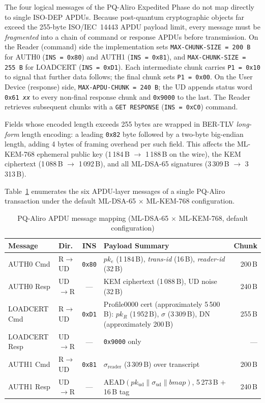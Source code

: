 \documentclass[runningheads]{llncs}
\begin{document}
The four logical messages of the PQ-Aliro Expedited Phase do not map directly
to single ISO-DEP APDUs.  Because post-quantum cryptographic objects far exceed
the 255-byte ISO/IEC~14443 APDU payload limit, every message must be
\emph{fragmented} into a chain of command or response APDUs before transmission.
On the Reader (command) side the implementation sets
\texttt{MAX-CHUNK-SIZE = 200\,B} for AUTH0 (\texttt{INS = 0x80}) and AUTH1
(\texttt{INS = 0x81}), and \texttt{MAX-CHUNK-SIZE = 255\,B} for LOADCERT
(\texttt{INS = 0xD1}).
Each intermediate chunk carries \texttt{P1 = 0x10} to signal that further data
follows; the final chunk sets \texttt{P1 = 0x00}.
On the User Device (response) side, \texttt{MAX-APDU-CHUNK = 240\,B}; the UD
appends status word \texttt{0x61\,\textit{xx}} to every non-final response chunk
and \texttt{0x9000} to the last.
The Reader retrieves subsequent chunks with a \texttt{GET RESPONSE}
(\texttt{INS = 0xC0}) command.

Fields whose encoded length exceeds 255 bytes are wrapped in BER-TLV
\emph{long-form} length encoding: a leading \texttt{0x82} byte followed by a
two-byte big-endian length, adding 4 bytes of framing overhead per such field.
This affects the ML-KEM-768 ephemeral public key (1\,184\,B $\to$ 1\,188\,B
on the wire), the KEM ciphertext (1\,088\,B $\to$ 1\,092\,B), and all
ML-DSA-65 signatures (3\,309\,B $\to$ 3\,313\,B).

Table~\ref{tab:apdu} enumerates the six APDU-layer messages of a single
PQ-Aliro transaction under the default ML-DSA-65 $\times$ ML-KEM-768
configuration.

\begin{table}[t]
\caption{PQ-Aliro APDU message mapping (ML-DSA-65 $\times$ ML-KEM-768, default configuration)}
\label{tab:apdu}
\centering
\small
\begin{tabular}{@{}llcp{4.8cm}r@{}}
\hline
\textbf{Message} & \textbf{Dir.} & \textbf{INS} & \textbf{Payload Summary} & \textbf{Chunk} \\
\hline
AUTH0 Cmd    & R$\to$UD & \texttt{0x80} &
    $pk_e$ (1\,184\,B), \textit{trans-id} (16\,B), \textit{reader-id} (32\,B) &
    200\,B \\
AUTH0 Resp   & UD$\to$R & --- &
    KEM ciphertext (1\,088\,B), UD noise (32\,B) &
    240\,B \\
LOADCERT Cmd & R$\to$UD & \texttt{0xD1} &
    Profile0000 cert (approximately 5\,500\,B): $pk_{R}$ (1\,952\,B), $\sigma$ (3\,309\,B), DN (approximately 200\,B) &
    255\,B \\
LOADCERT Resp & UD$\to$R & --- &
    \texttt{0x9000} only &
    --- \\
AUTH1 Cmd    & R$\to$UD & \texttt{0x81} &
    $\sigma_{\mathrm{reader}}$ (3\,309\,B) over transcript &
    200\,B \\
AUTH1 Resp   & UD$\to$R & --- &
    $\mathrm{AEAD}(pk_{\mathrm{ud}} \| \sigma_{\mathrm{ud}} \| \mathit{bmap})$,
    5\,273\,B $+$ 16\,B tag &
    240\,B \\
\hline
\end{tabular}
\end{table}
\end{document}
